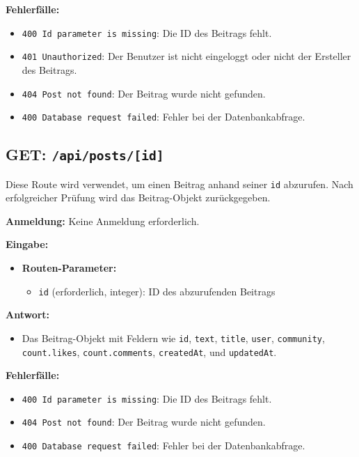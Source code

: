 \documentclass[a4paper,12pt]{article}
\begin{document}
\textbf{Fehlerfälle:}
\begin{itemize}
    \item \texttt{400 Id parameter is missing}: Die ID des Beitrags fehlt.
    \item \texttt{401 Unauthorized}: Der Benutzer ist nicht eingeloggt oder nicht der Ersteller des Beitrags.
    \item \texttt{404 Post not found}: Der Beitrag wurde nicht gefunden.
    \item \texttt{400 Database request failed}: Fehler bei der Datenbankabfrage.
\end{itemize}

\newpage
\subsection{GET: \texttt{/api/posts/[id]}}

Diese Route wird verwendet, um einen Beitrag anhand seiner \texttt{id} abzurufen. Nach erfolgreicher Prüfung wird das Beitrag-Objekt zurückgegeben.

\textbf{Anmeldung:} Keine Anmeldung erforderlich.

\textbf{Eingabe:}
\begin{itemize}
    \item \textbf{Routen-Parameter:}
    \begin{itemize}
        \item \texttt{id} (erforderlich, integer): ID des abzurufenden Beitrags
    \end{itemize}
\end{itemize}

\textbf{Antwort:}
\begin{itemize}
    \item Das Beitrag-Objekt mit Feldern wie \texttt{id}, \texttt{text}, \texttt{title}, \texttt{user}, \texttt{community}, \texttt{count.likes}, \texttt{count.comments}, \texttt{createdAt}, und \texttt{updatedAt}.
\end{itemize}

\textbf{Fehlerfälle:}
\begin{itemize}
    \item \texttt{400 Id parameter is missing}: Die ID des Beitrags fehlt.
    \item \texttt{404 Post not found}: Der Beitrag wurde nicht gefunden.
    \item \texttt{400 Database request failed}: Fehler bei der Datenbankabfrage.
\end{itemize}
\end{document}
